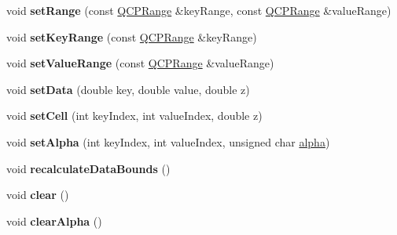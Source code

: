 \begin{DoxyCompactItemize}
\item 
void {\bfseries set\+Range} (const \hyperlink{class_q_c_p_range}{Q\+C\+P\+Range} \&key\+Range, const \hyperlink{class_q_c_p_range}{Q\+C\+P\+Range} \&value\+Range)\hypertarget{class_q_c_p_color_map_data_aad9c1c7c703c1339489fc730517c83d4}{}\label{class_q_c_p_color_map_data_aad9c1c7c703c1339489fc730517c83d4}

\item 
void {\bfseries set\+Key\+Range} (const \hyperlink{class_q_c_p_range}{Q\+C\+P\+Range} \&key\+Range)\hypertarget{class_q_c_p_color_map_data_a0738c485f3c9df9ea1241b7a8bb6a86e}{}\label{class_q_c_p_color_map_data_a0738c485f3c9df9ea1241b7a8bb6a86e}

\item 
void {\bfseries set\+Value\+Range} (const \hyperlink{class_q_c_p_range}{Q\+C\+P\+Range} \&value\+Range)\hypertarget{class_q_c_p_color_map_data_ada1b2680ba96a5f4175b6d341cf75d23}{}\label{class_q_c_p_color_map_data_ada1b2680ba96a5f4175b6d341cf75d23}

\item 
void {\bfseries set\+Data} (double key, double value, double z)\hypertarget{class_q_c_p_color_map_data_afd2083ccfd6987ec94aa7ef8e91ca39a}{}\label{class_q_c_p_color_map_data_afd2083ccfd6987ec94aa7ef8e91ca39a}

\item 
void {\bfseries set\+Cell} (int key\+Index, int value\+Index, double z)\hypertarget{class_q_c_p_color_map_data_a8e75eaf8746596319032a93f3d2d0683}{}\label{class_q_c_p_color_map_data_a8e75eaf8746596319032a93f3d2d0683}

\item 
void {\bfseries set\+Alpha} (int key\+Index, int value\+Index, unsigned char \hyperlink{class_q_c_p_color_map_data_a4f7e6b7a97017400cbbd46f0660e68ea}{alpha})\hypertarget{class_q_c_p_color_map_data_aaf7de5b34c58f38d8f4c1ceb064a876c}{}\label{class_q_c_p_color_map_data_aaf7de5b34c58f38d8f4c1ceb064a876c}

\item 
void {\bfseries recalculate\+Data\+Bounds} ()\hypertarget{class_q_c_p_color_map_data_ab235ade8a4d64bd3adb26a99b3dd57ee}{}\label{class_q_c_p_color_map_data_ab235ade8a4d64bd3adb26a99b3dd57ee}

\item 
void {\bfseries clear} ()\hypertarget{class_q_c_p_color_map_data_a9910ba830e96955bd5c8e5bef1e77ef3}{}\label{class_q_c_p_color_map_data_a9910ba830e96955bd5c8e5bef1e77ef3}

\item 
void {\bfseries clear\+Alpha} ()\hypertarget{class_q_c_p_color_map_data_a14d08b9c3720cd719400079b86d3906b}{}\label{class_q_c_p_color_map_data_a14d08b9c3720cd719400079b86d3906b}


\end{DoxyCompactItemize}
